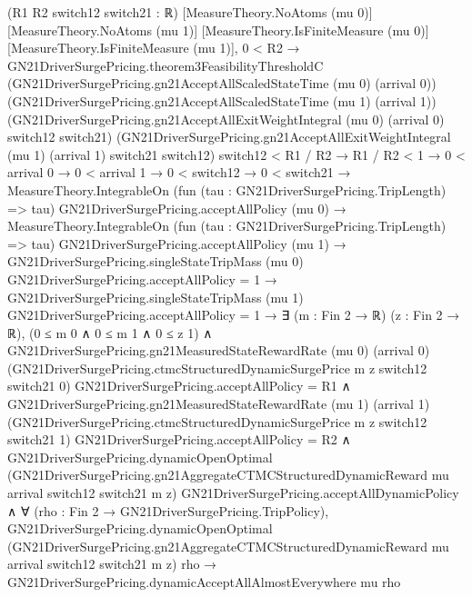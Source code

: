 \documentclass[10pt]{article}
\begin{document}
\begin{ReviewVerbatim}
    (R1 R2 switch12 switch21 : ℝ) [MeasureTheory.NoAtoms (mu 0)] [MeasureTheory.NoAtoms (mu 1)]
    [MeasureTheory.IsFiniteMeasure (mu 0)] [MeasureTheory.IsFiniteMeasure (mu 1)],
    0 < R2 →
      GN21DriverSurgePricing.theorem3FeasibilityThresholdC
            (GN21DriverSurgePricing.gn21AcceptAllScaledStateTime (mu 0) (arrival 0))
            (GN21DriverSurgePricing.gn21AcceptAllScaledStateTime (mu 1) (arrival 1))
            (GN21DriverSurgePricing.gn21AcceptAllExitWeightIntegral (mu 0) (arrival 0) switch12 switch21)
            (GN21DriverSurgePricing.gn21AcceptAllExitWeightIntegral (mu 1) (arrival 1) switch21 switch12) switch12 <
          R1 / R2 →
        R1 / R2 < 1 →
          0 < arrival 0 →
            0 < arrival 1 →
              0 < switch12 →
                0 < switch21 →
                  MeasureTheory.IntegrableOn (fun (tau : GN21DriverSurgePricing.TripLength) => tau)
                      GN21DriverSurgePricing.acceptAllPolicy (mu 0) →
                    MeasureTheory.IntegrableOn (fun (tau : GN21DriverSurgePricing.TripLength) => tau)
                        GN21DriverSurgePricing.acceptAllPolicy (mu 1) →
                      GN21DriverSurgePricing.singleStateTripMass (mu 0) GN21DriverSurgePricing.acceptAllPolicy = 1 →
                        GN21DriverSurgePricing.singleStateTripMass (mu 1) GN21DriverSurgePricing.acceptAllPolicy = 1 →
                          ∃ (m : Fin 2 → ℝ) (z : Fin 2 → ℝ),
                            (0 ≤ m 0 ∧ 0 ≤ m 1 ∧ 0 ≤ z 1) ∧
                              GN21DriverSurgePricing.gn21MeasuredStateRewardRate (mu 0) (arrival 0)
                                    (GN21DriverSurgePricing.ctmcStructuredDynamicSurgePrice m z switch12 switch21 0)
                                    GN21DriverSurgePricing.acceptAllPolicy =
                                  R1 ∧
                                GN21DriverSurgePricing.gn21MeasuredStateRewardRate (mu 1) (arrival 1)
                                      (GN21DriverSurgePricing.ctmcStructuredDynamicSurgePrice m z switch12 switch21 1)
                                      GN21DriverSurgePricing.acceptAllPolicy =
                                    R2 ∧
                                  GN21DriverSurgePricing.dynamicOpenOptimal
                                      (GN21DriverSurgePricing.gn21AggregateCTMCStructuredDynamicReward mu arrival
                                        switch12 switch21 m z)
                                      GN21DriverSurgePricing.acceptAllDynamicPolicy ∧
                                    ∀ (rho : Fin 2 → GN21DriverSurgePricing.TripPolicy),
                                      GN21DriverSurgePricing.dynamicOpenOptimal
                                          (GN21DriverSurgePricing.gn21AggregateCTMCStructuredDynamicReward mu arrival
                                            switch12 switch21 m z)
                                          rho →
                                        GN21DriverSurgePricing.dynamicAcceptAllAlmostEverywhere mu rho
\end{ReviewVerbatim}
\end{document}
